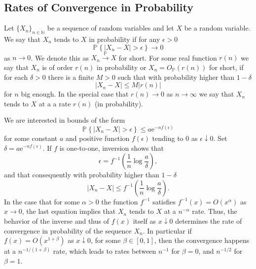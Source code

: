 \documentclass{uvamath}
\newcommand*{\nats}{\mathbb{N}}
\newcommand*{\bbP}{\mathbb{P}}
\newcommand*{\prob}[2][]{\mathbb{P}_{#1}\left\{#2\right\}}
\newcommand*{\paren}[1]{\left(#1\right)}
\newcommand*{\toinP}{\overset{\bbP}{\longrightarrow}}
\newcommand*{\rme}{\mathrm{e}}
\theoremstyle{remark}
\theoremstyle{definition}
\theoremstyle{definition}
\theoremstyle{definition}
\theoremstyle{definition}
\theoremstyle{definition}
\begin{document}
\begin{appendices}

\chapter{Rates of Convergence in Probability\label{app:basic_rates}}

Let $\{X_n\}_{n\in\nats}$ be a sequence of random variables and let
$X$ be a random variable. We say that $X_n$ tends to $X$ in
probability if for any $\epsilon>0$
\begin{equation*}
  \prob{|X_n - X| >\epsilon}\to 0
\end{equation*}
as $n\to 0$. We denote this as $X_n\toinP X$ for short. For some real
function $r(n)$ we say that $X_n$ is of order $r(n)$ in probability or
$X_n = O_{\bbP}(r(n))$ for short, if for each $\delta>0$ there is a
finite $M>0$ such that with probability higher than $1-\delta$
\begin{equation*}
  |X_n - X|  \leq M |r(n)|
\end{equation*}
for $n$ big enough. In the special case that $r(n)\to 0$ as
$n\to\infty$ we say that $X_n$ tends to $X$ at a a rate $r(n)$ (in
probability).

We are interested in bounds of the form
\begin{equation*}
  \prob{|X_n - X| > \epsilon}\leq a\rme^{-nf(\epsilon)}
\end{equation*}
for some constant $a$ and positive function $f(\epsilon)$ tending to 0
as $\epsilon\downarrow 0$. Set $\delta = a\rme^{-nf(\epsilon)}$. If
$f$ is one-to-one, inversion shows that
\begin{equation*}
  \epsilon = f^{-1}\paren{\frac{1}{n}\log\frac{a}{\delta}},
\end{equation*}
and that consequently with probability higher than
$1-\delta$
\begin{equation*}
  |X_n- X| \leq f^{-1}\paren{\frac{1}{n}\log\frac{a}{\delta}}.
\end{equation*}
In the case that for some $\alpha> 0$ the function $f^{-1}$ satisfies
$f^{-1}(x) = O(x^{\alpha})$ as $x\to 0$, the last equation implies
that $X_n$ tends to $X$ at a $n^{-\alpha}$ rate. Thus, the behavior
of the inverse and thus of $f(x)$ itself as $x\downarrow 0$ determines
the rate of convergence in probability of the sequence $X_n$. In
particular if $f(x) = O(x^{1+\beta})$ as $x\downarrow 0$, for some
$\beta\in [0,1]$, then the convergence happens at a $n^{-1/(1+\beta)}$
rate, which leads to rates between $n^{-1}$ for $\beta = 0$, and
$n^{-1/2}$ for $\beta = 1$.


\end{appendices}
\end{document}
